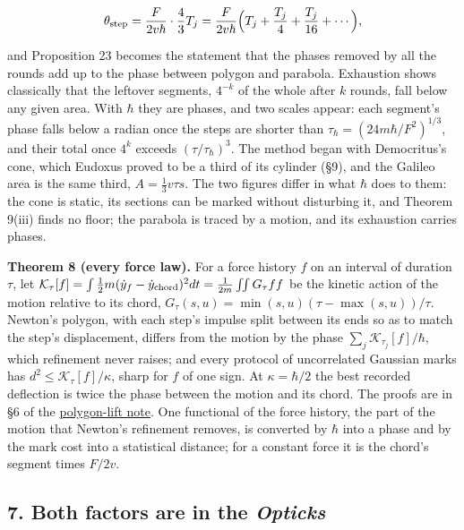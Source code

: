\documentclass[11pt,a4paper]{article}
\begin{document}
\[\theta_{\rm step}=\frac{F}{2v\hbar}\cdot\frac43T_j
=\frac{F}{2v\hbar}\Bigl(T_j+\frac{T_j}4+\frac{T_j}{16}+\cdots\Bigr),\]

and Proposition 23 becomes the statement that the phases removed by all
the rounds add up to the phase between polygon and parabola. Exhaustion
shows classically that the leftover segments, \(4^{-k}\) of the whole
after \(k\) rounds, fall below any given area. With \(\hbar\) they are
phases, and two scales appear: each segment's phase falls below a radian
once the steps are shorter than \(\tau_\hbar=(24m\hbar/F^2)^{1/3}\), and
their total once \(4^k\) exceeds \((\tau/\tau_\hbar)^3\). The method
began with Democritus's cone, which Eudoxus proved to be a third of its
cylinder (§9), and the Galileo area is the same third,
\(A=\frac13v\tau s\). The two figures differ in what \(\hbar\) does to
them: the cone is static, its sections can be marked without disturbing
it, and Theorem 9(iii) finds no floor; the parabola is traced by a
motion, and its exhaustion carries phases.

\textbf{Theorem 8 (every force law).} For a force history \(f\) on an
interval of duration \(\tau\), let
\(\mathcal K_\tau[f]=\int\frac12m(\dot y_f-\dot y_{\rm chord})^2dt =\frac1{2m}\iint G_\tau ff\)
be the kinetic action of the motion relative to its chord,
\(G_\tau(s,u)=\min(s,u)(\tau-\max(s,u))/\tau\). Newton's polygon, with
each step's impulse split between its ends so as to match the step's
displacement, differs from the motion by the phase
\(\sum_j\mathcal K_{\tau_j}[f]/\hbar\), which refinement never raises;
and every protocol of uncorrelated Gaussian marks has
\(d^2\le\mathcal K_\tau[f]/\kappa\), sharp for \(f\) of one sign. At
\(\kappa=\hbar/2\) the best recorded deflection is twice the phase
between the motion and its chord. The proofs are in §6 of the
\href{cut-measure-newton.md\#weyl-lifting-and-polygon-phases}{polygon-lift
note}. One functional of the force history, the part of the motion that
Newton's refinement removes, is converted by \(\hbar\) into a phase and
by the mark cost into a statistical distance; for a constant force it is
the chord's segment times \(F/2v\).

\hypertarget{both-factors-are-in-the-opticks}{%
\subsection{\texorpdfstring{7. Both factors are in the
\emph{Opticks}}{7. Both factors are in the Opticks}}\label{both-factors-are-in-the-opticks}}
\end{document}
